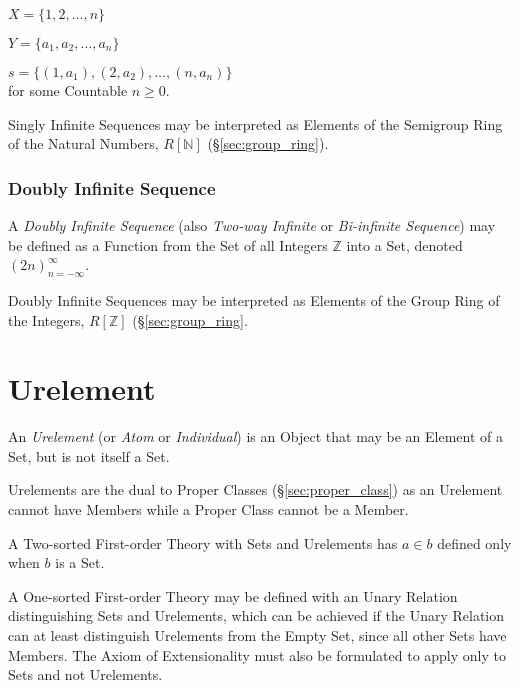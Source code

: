   $X = \{1,2,\ldots,n\}$

  $Y = \{a_1, a_2,\ldots,a_n\}$

  $s = \{(1,a_1), (2,a_2),\ldots, (n,a_n)\}$ \\
for some Countable $n \geq 0$.

Singly Infinite Sequences may be interpreted as Elements of the
Semigroup Ring of the Natural Numbers, $R[\mathbb{N}]$
(\S\ref{sec:group_ring}).



\subsubsection{Doubly Infinite Sequence}\label{sec:doubly_infinite}

A \emph{Doubly Infinite Sequence} (also \emph{Two-way Infinite} or
\emph{Bi-infinite Sequence}) may be defined as a Function from the Set
of all Integers $\mathbb{Z}$ into a Set, denoted
$(2n)^{\infty}_{n=-\infty}$.

Doubly Infinite Sequences may be interpreted as Elements of the Group
Ring of the Integers, $R[\mathbb{Z}]$ (\S\ref{sec:group_ring}.



\section{Urelement}\label{sec:urelement}

An \emph{Urelement} (or \emph{Atom} or \emph{Individual}) is an Object
that may be an Element of a Set, but is not itself a Set.

Urelements are the dual to Proper Classes (\S\ref{sec:proper_class})
as an Urelement cannot have Members while a Proper Class cannot be a
Member.

A Two-sorted First-order Theory with Sets and Urelements has $a \in b$
defined only when $b$ is a Set.

A One-sorted First-order Theory may be defined with an Unary Relation
distinguishing Sets and Urelements, which can be achieved if the Unary
Relation can at least distinguish Urelements from the Empty Set, since
all other Sets have Members. The Axiom of Extensionality must also be
formulated to apply only to Sets and not Urelements.



